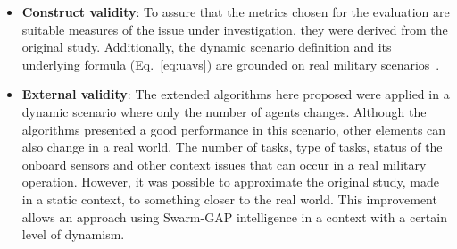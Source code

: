 \begin{itemize}
   \item \textbf{Construct validity}: To assure that the metrics chosen for the evaluation are suitable measures of the issue under investigation, they were derived from the original study. Additionally, the dynamic scenario definition and its underlying formula (Eq.~\ref{eq:uavs}) are grounded on real military scenarios~\cite{CC02}.
   
   
   \item \textbf{External validity}: The extended algorithms here proposed were applied in a dynamic scenario where only the number of agents changes. Although the algorithms presented a good performance in this scenario, other elements can also change in a real world. The number of tasks, type of tasks, status of the onboard sensors and other context issues that can occur in a real military operation. However, it was possible to approximate the original study, made in a static context, to something closer to the real world. This improvement allows an approach using Swarm-GAP intelligence in a context with a certain level of dynamism.
\end{itemize}

